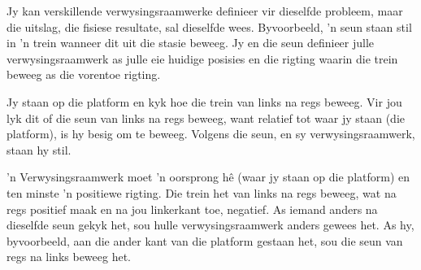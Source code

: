 Jy kan verskillende verwysingsraamwerke definieer vir dieselfde probleem, maar die uitslag, die fisiese resultate, sal dieselfde wees. Byvoorbeeld, 'n seun staan stil in 'n trein wanneer dit uit die stasie beweeg. Jy en die seun definieer julle verwysingsraamwerk as julle eie huidige posisies en die rigting waarin die trein beweeg as die vorentoe rigting. 

Jy staan op die platform en kyk hoe die trein van links na regs beweeg. Vir jou lyk dit of die seun van links na regs beweeg, want relatief tot waar jy staan (die platform), is hy besig om te beweeg. Volgens die seun, en sy verwysingsraamwerk, staan hy stil.\par 
        
 'n Verwysingsraamwerk moet 'n oorsprong h\^e (waar jy staan op die platform) en ten minste 'n positiewe rigting. Die trein het van links na regs beweeg, wat na regs positief maak en na jou linkerkant toe, negatief. As iemand anders na dieselfde seun gekyk het, sou hulle verwysingsraamwerk anders gewees het. As hy, byvoorbeeld, aan die ander kant van die platform gestaan het, sou die seun van regs na links beweeg het. \par

